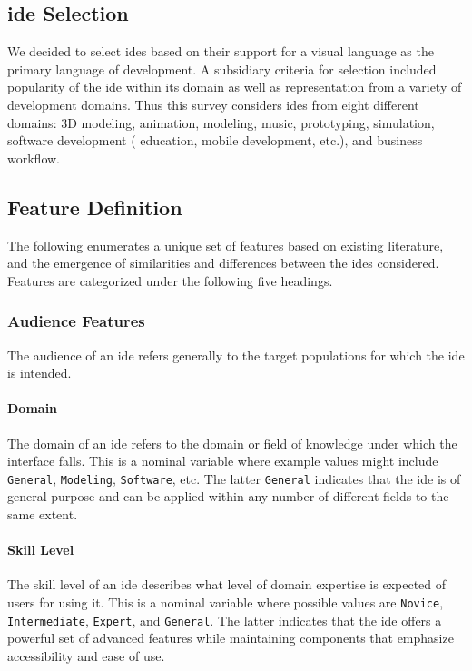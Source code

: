 \subsection{\acs{ide} Selection} \label{subsec:ideselection}

We decided to select \acp{ide} based on their support for a visual language
as the primary language of development. A subsidiary criteria for
selection included popularity of the \ac{ide} within its domain as well as
representation from a variety of development domains. Thus this survey
considers \acp{ide} from eight different domains: 3D modeling, animation,
modeling, music, prototyping, simulation, software development (\eg
education, mobile development, etc.), and business workflow.


\subsection{Feature Definition} \label{subsec:featuredefinition}

The following enumerates a unique set of features based on existing literature, and the emergence of similarities and differences between the \acp{ide} considered.
Features are categorized under the following five headings.


\subsubsection{Audience Features} \label{subsubsec:audience}

The audience of an \ac{ide} refers generally to the target populations for which
the \ac{ide} is intended.


\paragraph{Domain}
The domain of an \ac{ide} refers to the domain or field of
knowledge under which the interface falls.
This is a nominal variable where example values might include \texttt{General}, \texttt{Modeling}, \texttt{Software}, etc.
The latter \texttt{General} indicates that the \ac{ide} is of general purpose and can be applied within any number of different fields to the same extent.


\paragraph{Skill Level}
The skill level of an \ac{ide} describes what level of domain expertise is expected of users for using it.
This is a nominal variable where possible values are \texttt{Novice}, \texttt{Intermediate}, \texttt{Expert}, and \texttt{General}.
The latter indicates that the \ac{ide} offers a powerful set of advanced features while maintaining components that emphasize accessibility and ease of use.


